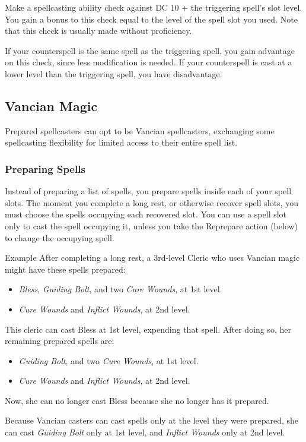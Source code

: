 \documentclass[letterpaper,twocolumn,openany,nodeprecatedcode,bg=print]{dndbook}
\begin{document}
Make a spellcasting ability check against DC 10 + the triggering spell's slot level. 
You gain a bonus to this check equal to the level of the spell slot you used. 
Note that this check is usually made without proficiency.

If your counterspell is the same spell as the triggering spell, you gain advantage on this check, since less modification is needed. 
If your counterspell is cast at a lower level than the triggering spell, you have disadvantage.

\subsection{Vancian Magic}
Prepared spellcasters can opt to be Vancian spellcasters, 
exchanging some spellcasting flexibility for limited access to their entire spell list.

\subsubsection{Preparing Spells}
Instead of preparing a list of spells, you prepare spells inside each of your spell slots. 
The moment you complete a long rest, or otherwise recover spell slots, you must choose the spells occupying each recovered slot. 
You can use a spell slot only to cast the spell occupying it, unless you take the Reprepare action (below) to change the occupying spell.

\begin{DndComment}{Example}
After completing a long rest, a 3rd-level Cleric who uses Vancian magic might have these spells prepared:

\begin{itemize}
\item \textit{Bless}, \textit{Guiding Bolt}, and two \textit{Cure Wounds}, at 1st level.
\item \textit{Cure Wounds} and \textit{Inflict Wounds}, at 2nd level.
\end{itemize}

\noindent This cleric can cast Bless at 1st level, expending that spell. 
After doing so, her remaining prepared spells are:

\begin{itemize}
\item \textit{Guiding Bolt}, and two \textit{Cure Wounds}, at 1st level.
\item \textit{Cure Wounds} and \textit{Inflict Wounds}, at 2nd level.
\end{itemize}

\noindent Now, she can no longer cast Bless because she no longer has it prepared. 

Because Vancian casters can cast spells only at the level they were prepared, 
she can cast \textit{Guiding Bolt} only at 1st level, and \textit{Inflict Wounds} only at 2nd level.
\end{DndComment}
\end{document}
